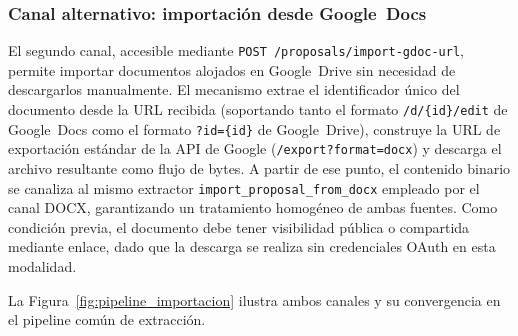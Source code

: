 \subsubsection{Canal alternativo: importaci\'{o}n desde Google~Docs}
\label{subsubsec:import_gdoc}

El segundo canal, accesible mediante \texttt{POST /proposals/import-gdoc-url},
permite importar documentos alojados en Google~Drive sin necesidad de
descargarlos manualmente. El mecanismo extrae el identificador \'{u}nico del
documento desde la URL recibida (soportando tanto el formato
\texttt{/d/\{id\}/edit} de Google~Docs como el formato
\texttt{?id=\{id\}} de Google~Drive), construye la URL de exportaci\'{o}n
est\'{a}ndar de la API de Google
(\texttt{/export?format=docx}) y descarga el archivo resultante como flujo de
bytes. A partir de ese punto, el contenido binario se canaliza al mismo extractor
\texttt{import\_proposal\_from\_docx} empleado por el canal DOCX, garantizando
un tratamiento homog\'{e}neo de ambas fuentes. Como condici\'{o}n previa, el
documento debe tener visibilidad p\'{u}blica o compartida mediante enlace, dado
que la descarga se realiza sin credenciales OAuth en esta modalidad.

La Figura~\ref{fig:pipeline_importacion} ilustra ambos canales y su
convergencia en el pipeline com\'{u}n de extracci\'{o}n.

